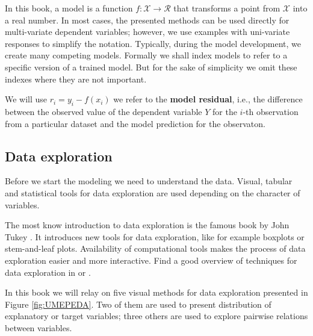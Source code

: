 \documentclass[12pt,]{krantz}
\begin{document}
In this book, a model is a function \(f:\mathcal X \rightarrow \mathcal R\) that transforms a point from \(\mathcal X\) into a real number. In most cases, the presented methods can be used directly for multi-variate dependent variables; however, we use examples with uni-variate responses to simplify the notation.
Typically, during the model development, we create many competing models. Formally we shall index models to refer to a specific version of a trained model. But for the sake of simplicity we omit these indexes where they are not important.

We will use \(r_i = y_i - f(x_i)\) we refer to the \textbf{model residual}, i.e., the difference between the observed value of the dependent variable \(Y\) for the \(i\)-th observation from a particular dataset and the model prediction for the observaton.

\hypertarget{data-exploration}{%
\subsection{Data exploration}\label{data-exploration}}

Before we start the modeling we need to understand the data.
Visual, tabular and statistical tools for data exploration are used depending on the character of variables.

The most know introduction to data exploration is the famous book by John Tukey \citep{tukey1977}. It introduces new tools for data exploration, like for example boxplots or stem-and-leaf plots. Availability of computational tools makes the process of data exploration easier and more interactive. Find a good overview of techniques for data exploration in \citep{Nolan2015} or \citep{Wickham2017}.

In this book we will relay on five visual methods for data exploration presented in Figure \ref{fig:UMEPEDA}. Two of them are used to present distribution of explanatory or target variables; three others are used to explore pairwise relations between variables.
\end{document}
